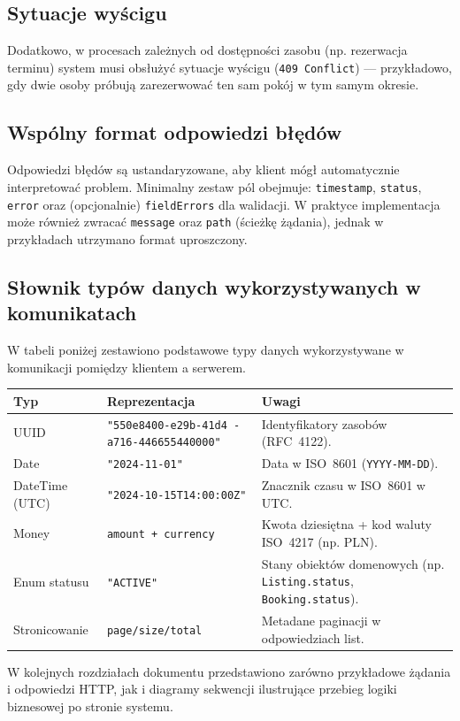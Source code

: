 \documentclass[11pt, a4paper]{article}
\begin{document}
\subsection{Sytuacje wyścigu}
Dodatkowo, w procesach zależnych od dostępności zasobu (np. rezerwacja terminu)
system musi obsłużyć sytuacje wyścigu (\texttt{409 Conflict}) --- przykładowo, gdy dwie osoby próbują zarezerwować ten sam pokój w tym samym okresie.

\subsection{Wspólny format odpowiedzi błędów}
Odpowiedzi błędów są ustandaryzowane, aby klient mógł automatycznie interpretować problem. Minimalny zestaw pól obejmuje:
\texttt{timestamp}, \texttt{status}, \texttt{error} oraz (opcjonalnie) \texttt{fieldErrors} dla walidacji. W praktyce implementacja może również zwracać
\texttt{message} oraz \texttt{path} (ścieżkę żądania), jednak w przykładach utrzymano format uproszczony.

\subsection{Słownik typów danych wykorzystywanych w komunikatach}
W tabeli poniżej zestawiono podstawowe typy danych wykorzystywane w komunikacji pomiędzy klientem a serwerem.

\begin{longtable}{|p{3cm}|p{5cm}|p{7cm}|}
\hline
\textbf{Typ} & \textbf{Reprezentacja} & \textbf{Uwagi} \\ \hline
UUID & \texttt{"550e8400-e29b-41d4
-a716-446655440000"} & Identyfikatory zasobów (RFC~4122). \\ \hline
Date & \texttt{"2024-11-01"} & Data w ISO~8601 (\texttt{YYYY-MM-DD}). \\ \hline
DateTime (UTC) & \texttt{"2024-10-15T14:00:00Z"} & Znacznik czasu w ISO~8601 w UTC. \\ \hline
Money & \texttt{amount + currency} & Kwota dziesiętna + kod waluty ISO~4217 (np. PLN). \\ \hline
Enum statusu & \texttt{"ACTIVE"} & Stany obiektów domenowych (np. \texttt{Listing.status}, \texttt{Booking.status}). \\ \hline
Stronicowanie & \texttt{page/size/total} & Metadane paginacji w odpowiedziach list. \\ \hline
\end{longtable}


W kolejnych rozdziałach dokumentu przedstawiono zarówno przykładowe żądania
i odpowiedzi HTTP, jak i diagramy sekwencji ilustrujące przebieg logiki biznesowej
po stronie systemu.
\end{document}
